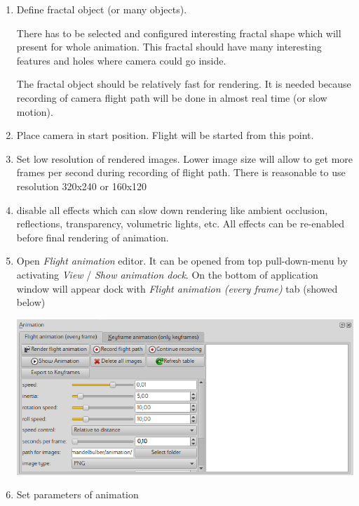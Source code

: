 \begin{enumerate}
	\item Define fractal object (or many objects). 
	
	There has to be selected and configured interesting fractal shape which will present for whole animation. This fractal should have many interesting features and holes where camera could go inside.
	
	The fractal object should be relatively fast for rendering. It is needed because recording of camera flight path will be done in almost real time (or slow motion). 
	
	\item Place camera in start position. Flight will be started from this point.
	
	\item Set low resolution of rendered images. Lower image size will allow to get more frames per second during recording of flight path. There is reasonable to use resolution 320x240 or 160x120
	
	\item disable all effects which can slow down rendering like ambient occlusion, reflections, transparency, volumetric lights, etc. All effects can be re-enabled before final rendering of animation.
	
	\item Open \emph{Flight animation} editor. It can be opened from top pull-down-menu by activating \emph{View} / \emph{Show animation dock}. On the bottom of application window will appear dock with \emph{Flight animation (every frame)} tab (showed below)
	
	\includegraphics[width=0.7\linewidth]{img/manual/media/flight_animation_dock.png}
	
	\item Set parameters of animation
	

\end{enumerate}
